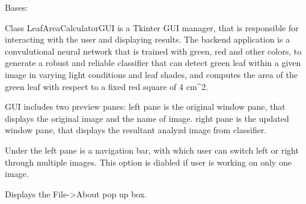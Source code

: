 \documentclass[letterpaper,10pt,english]{sphinxmanual}
\begin{document}
\begin{fulllineitems}
\label{\detokenize{pyleaf.leaf_area_calculator_gui:pyleaf.leaf_area_calculator_gui.LeafAreaCalculatorGUI}}
Bases: 

Class LeafAreaCalculatorGUI is a Tkinter GUI manager, that is responsible for interacting with the user
and displaying results.
The backend application is a convulutional neural network that is trained with green, red and other colors,
to generate a robust and reliable classifier that can detect green leaf within a given image in varying light conditions and leaf shades,
and computes the area of the green leaf with respect to a fixed red square of 4 cm\textasciicircum{}2.

GUI includes two preview panes:
left pane is the original window pane, that displays the original image and the name of image.
right pane is the updated window pane, that displays the resultant analyzd image from classifier.

Under the left pane is a navigation bar, with which user can switch left or right through multiple images. This option is diabled if user is working on only one image.

\begin{fulllineitems}
\label{\detokenize{pyleaf.leaf_area_calculator_gui:pyleaf.leaf_area_calculator_gui.LeafAreaCalculatorGUI.About}}
Displays the File-\textgreater{}About pop up box.

\end{fulllineitems}


\begin{fulllineitems}
\label{\detokenize{pyleaf.leaf_area_calculator_gui:pyleaf.leaf_area_calculator_gui.LeafAreaCalculatorGUI.IMAGE_HEIGHT}}
\end{fulllineitems}


\end{fulllineitems}
\end{document}
